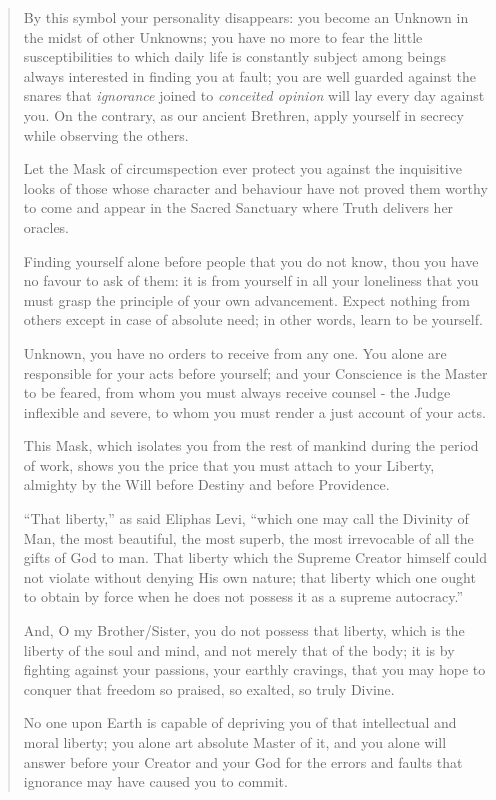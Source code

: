 \begin{quote}
	By this symbol your personality disappears: you become an Unknown in the midst of other
	Unknowns; you have no more to fear the little susceptibilities to which daily life is constantly
	subject among beings always interested in finding you at fault; you are well guarded against
	the snares that \textit{ignorance} joined to \textit{conceited opinion} will lay every day against you. On the
	contrary, as our ancient Brethren, apply yourself in secrecy while observing the others. 
	
	Let the Mask of circumspection ever protect you against the inquisitive looks of those
	whose character and behaviour have not proved them worthy to come and appear in the
	Sacred Sanctuary where Truth delivers her oracles.
	
	Finding yourself alone before people that you do not know, thou you have no favour to ask
	of them: it is from yourself in all your loneliness that you must grasp the principle of your
	own advancement. Expect nothing from others except in case of absolute need; in other
	words, learn to be yourself.
	
	Unknown, you have no orders to receive from any one. You alone are responsible for your
	acts before yourself; and your Conscience is the Master to be feared, from whom you must
	always receive counsel - the Judge inflexible and severe, to whom you must render a just
	account of your acts.
	
	This Mask, which isolates you from the rest of mankind during the period of work, shows
	you the price that you must attach to your Liberty, almighty by the Will before Destiny and
	before Providence. 
	
	``That liberty,'' as said Eliphas Levi, ``which one may call the Divinity of Man, the most
	beautiful, the most superb, the most irrevocable of all the gifts of God to man. That liberty
	which the Supreme Creator himself could not violate without denying His own nature; that
	liberty which one ought to obtain by force when he does not possess it as a supreme
	autocracy.''
	
	And, O my Brother/Sister, you do not possess that liberty, which is the liberty of the soul
	and mind, and not merely that of the body; it is by fighting against your passions, your earthly
	cravings, that you may hope to conquer that freedom so praised, so exalted, so truly Divine.
	
	No one upon Earth is capable of depriving you of that intellectual and moral liberty; you
	alone art absolute Master of it, and you alone will answer before your Creator and your God
	for the errors and faults that ignorance may have caused you to commit. 
	

\end{quote}

